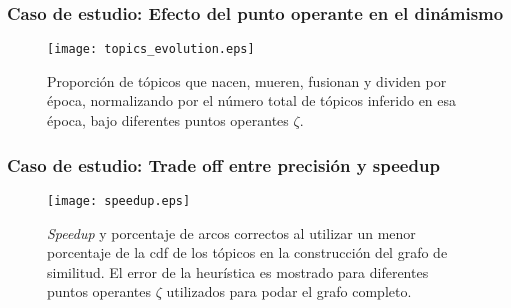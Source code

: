 \documentclass[
	spanish, %
	aspectratio=43, %
	hyperref={pdfencoding=auto,psdextra},
	xcolor={dvipsnames,table,usenames},
]{beamer}
\begin{document}
\begin{frame}[t]
\frametitle{Caso de estudio: Efecto del punto operante en el dinámismo}

\begin{figure}

\vspace*{-0.2in}
\texttt{[image: topics\_evolution.eps]}
\caption{Proporción de tópicos que nacen, mueren, fusionan y dividen por época, normalizando por el número total de tópicos inferido en esa época, bajo diferentes puntos operantes $\zeta$.}
\label{img:topics_evolution}
\end{figure}

\end{frame}


\begin{frame}[t]
\frametitle{Caso de estudio: Trade off entre precisión y speedup}
 
\vspace*{-0.2in}
\begin{figure}
\texttt{[image: speedup.eps]}
\caption{\textit{Speedup} y porcentaje de arcos correctos al utilizar un menor porcentaje de la cdf de los tópicos en la construcción del grafo de similitud. El error de la heurística es mostrado para diferentes puntos operantes $\zeta$ utilizados para podar el grafo completo.} 
\label{img:speedup}
\end{figure}

\end{frame}
\end{document}
